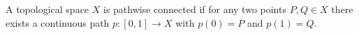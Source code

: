 A topological space $X$ is pathwise connected if for any two points $P, Q \in X$ there exists a continuous path $p: [0,1] \to X$ with $p(0) = P$ and $p(1) = Q$.
